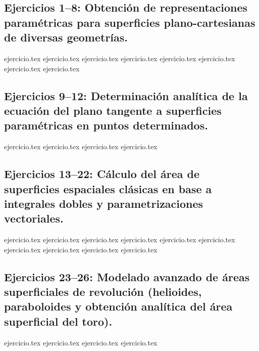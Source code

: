 
\subsection*{Ejercicios 1--8: Obtención de representaciones paramétricas para superficies plano-cartesianas de diversas geometrías.}
\begin{enumerate}
    {ejercicio.tex}
    {ejercicio.tex}
    {ejercicio.tex}
    {ejercicio.tex}
    {ejercicio.tex}
    {ejercicio.tex}
    {ejercicio.tex}
    {ejercicio.tex}
\end{enumerate}

\subsection*{Ejercicios 9--12: Determinación analítica de la ecuación del plano tangente a superficies paramétricas en puntos determinados.}
\begin{enumerate}
    \setcounter{enumi}{8}
    {ejercicio.tex}
    {ejercicio.tex}
    {ejercicio.tex}
    {ejercicio.tex}
\end{enumerate}

\subsection*{Ejercicios 13--22: Cálculo del área de superficies espaciales clásicas en base a integrales dobles y parametrizaciones vectoriales.}
\begin{enumerate}
    \setcounter{enumi}{12}
    {ejercicio.tex}
    {ejercicio.tex}
    {ejercicio.tex}
    {ejercicio.tex}
    {ejercicio.tex}
    {ejercicio.tex}
    {ejercicio.tex}
    {ejercicio.tex}
    {ejercicio.tex}
    {ejercicio.tex}
\end{enumerate}

\subsection*{Ejercicios 23--26: Modelado avanzado de áreas superficiales de revolución (helioides, paraboloides y obtención analítica del área superficial del toro).}
\begin{enumerate}
    \setcounter{enumi}{22}
    {ejercicio.tex}
    {ejercicio.tex}
    {ejercicio.tex}
    {ejercicio.tex}
\end{enumerate}
